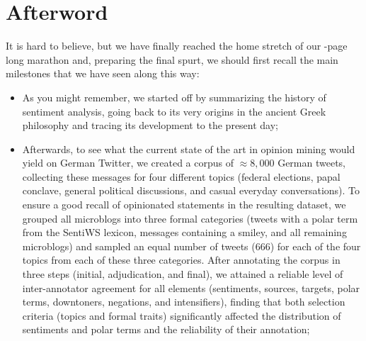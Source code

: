 \chapter*{Afterword}

It is hard to believe, but we have finally reached the home stretch of
our \thepage-page long marathon and, preparing the final spurt, we
should first recall the main milestones that we have seen along this
way:
\begin{itemize}
\item As you might remember, we started off by summarizing the history
  of sentiment analysis, going back to its very origins in the ancient
  Greek philosophy and tracing its development to the present day;

\item Afterwards, to see what the current state of the art in opinion
  mining would yield on German Twitter, we created a corpus of
  $\approx8,000$ German tweets, collecting these messages for four
  different topics (federal elections, papal conclave, general
  political discussions, and casual everyday conversations).  To
  ensure a good recall of opinionated statements in the resulting
  dataset, we grouped all microblogs into three formal categories
  (tweets with a polar term from the SentiWS lexicon, messages
  containing a smiley, and all remaining microblogs) and sampled an
  equal number of tweets (666) for each of the four topics from each
  of these three categories.  After annotating the corpus in three
  steps (initial, adjudication, and final), we attained a reliable
  level of inter-annotator agreement for all elements (sentiments,
  sources, targets, polar terms, downtoners, negations, and
  intensifiers), finding that both selection criteria (topics and
  formal traits) significantly affected the distribution of sentiments
  and polar terms and the reliability of their annotation;


\end{itemize}
